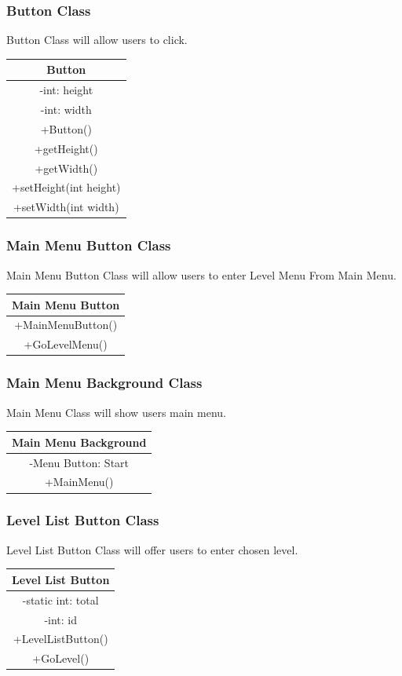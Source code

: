 \subsubsection{Button Class}
Button Class will allow users to click.
\begin{center}\begin{tabular}{ |c| } \hline Button \\ \hline -int: height \\ -int: width \\ \hline +Button() \\ +getHeight() \\ +getWidth() \\ +setHeight(int height) \\ +setWidth(int width) \\ \hline \end{tabular}\end{center}

\subsubsection{Main Menu Button Class}
Main Menu Button Class will allow users to enter Level Menu From Main Menu.
\begin{center}\begin{tabular}{ |c| } \hline Main Menu Button \\ \hline +MainMenuButton() \\ +GoLevelMenu()\\ \hline \end{tabular}\end{center}

\subsubsection{Main Menu Background Class}
Main Menu Class will show users main menu. 
\begin{center}\begin{tabular}{ |c| } \hline Main Menu Background \\ \hline -Menu Button: Start \\ \hline +MainMenu() \\ \hline \end{tabular}\end{center}

\subsubsection{Level List Button Class}
Level List Button Class will offer users to enter chosen level.
\begin{center}\begin{tabular}{ |c| } \hline Level List Button \\ \hline -static int: total \\ -int: id \\ \hline +LevelListButton() \\ +GoLevel() \\ \hline \end{tabular}\end{center}

